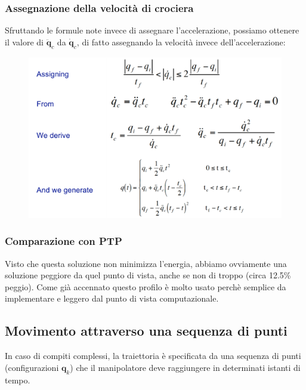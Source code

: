 \vspace*{10pt}
\subsubsection{Assegnazione della velocità di crociera}
Sfruttando le formule note invece di assegnare l'accelerazione, possiamo ottenere il valore di $\bm{\ddot{q}}_c$ da $\bm{\dot{q}}_c$, di fatto assegnando la velocità invece dell'accelerazione:
\begin{figure}[H]
	\centering
	\includegraphics[width=0.9\linewidth]{images/trajectories_15}
	\label{fig:trajectories15}
\end{figure}



\vspace*{10pt}
\subsubsection{Comparazione con PTP}
Visto che questa soluzione non minimizza l'energia, abbiamo ovviamente una soluzione peggiore da quel punto di vista, anche se non di troppo (circa 12.5\% peggio). Come già accennato questo profilo è molto usato perchè semplice da implementare e leggero dal punto di vista computazionale.





\vspace*{15pt}
\subsection{Movimento attraverso una sequenza di punti}
In caso di compiti complessi, la traiettoria è specificata da una sequenza di punti (configurazioni $\bm{q}_k$) che il manipolatore deve raggiungere in determinati istanti di tempo.

